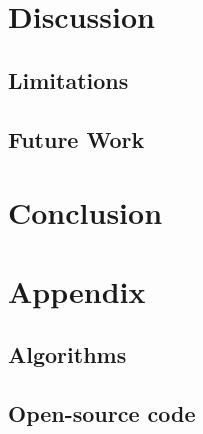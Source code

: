 \documentclass{article}
\begin{document}
\section{Discussion}

\subsection{Limitations}


\subsection{Future Work}

\section{Conclusion}

\section{Appendix}
\subsection{Algorithms}
\subsection{Open-source code}




\end{document}
